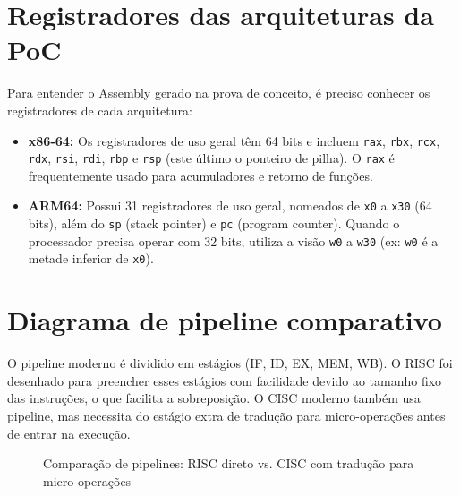\section{Registradores das arquiteturas da PoC}
Para entender o Assembly gerado na prova de conceito, é preciso conhecer os registradores de cada arquitetura:
\begin{itemize}
    \item \textbf{x86-64:} Os registradores de uso geral têm 64 bits e incluem \texttt{rax}, \texttt{rbx}, \texttt{rcx}, \texttt{rdx}, \texttt{rsi}, \texttt{rdi}, \texttt{rbp} e \texttt{rsp} (este último o ponteiro de pilha). O \texttt{rax} é frequentemente usado para acumuladores e retorno de funções.
    \item \textbf{ARM64:} Possui 31 registradores de uso geral, nomeados de \texttt{x0} a \texttt{x30} (64 bits), além do \texttt{sp} (stack pointer) e \texttt{pc} (program counter). Quando o processador precisa operar com 32 bits, utiliza a visão \texttt{w0} a \texttt{w30} (ex: \texttt{w0} é a metade inferior de \texttt{x0}).
\end{itemize}

\section{Diagrama de pipeline comparativo}
O pipeline moderno é dividido em estágios (IF, ID, EX, MEM, WB). O RISC foi desenhado para preencher esses estágios com facilidade devido ao tamanho fixo das instruções, o que facilita a sobreposição. O CISC moderno também usa pipeline, mas necessita do estágio extra de tradução para micro-operações antes de entrar na execução.

\begin{figure}[htbp]
    \centering
    \caption{Comparação de pipelines: RISC direto vs. CISC com tradução para micro-operações}
    \label{fig:pipeline}
\end{figure}